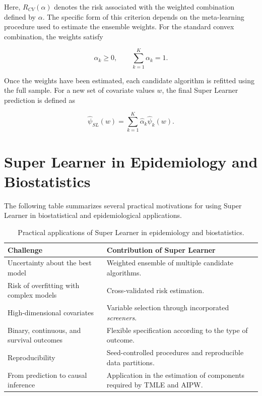 \documentclass[12pt]{article}
\begin{document}
Here, $R_{CV}(\alpha)$ denotes the risk associated with the weighted combination defined by $\alpha$.
The specific form of this criterion depends on the meta-learning procedure used to estimate the ensemble weights. For the standard convex combination, the weights satisfy

\begin{equation}
    \alpha_k \geq 0,
    \qquad
    \sum_{k=1}^{K} \alpha_k = 1.
\end{equation}

Once the weights have been estimated, each candidate algorithm is refitted using the full sample. For a new set of covariate values $w$, the final Super Learner prediction is defined as

\begin{equation}
    \widehat{\psi}_{SL}(w)
    =
    \sum_{k=1}^{K}
    \widehat{\alpha}_k
    \widehat{\psi}_k(w).
\end{equation}

\section{Super Learner in Epidemiology and Biostatistics}
The following table summarizes several practical motivations for using Super Learner in biostatistical and epidemiological applications.

\begin{table}[H]
\centering
\caption{Practical applications of Super Learner in epidemiology and biostatistics.}
\label{tab:sl_applications}
\begin{tabularx}{\textwidth}{p{} X}
\toprule
\textbf{Challenge} & \textbf{Contribution of Super Learner} \\
\midrule
Uncertainty about the best model & Weighted ensemble of multiple candidate algorithms. \\
Risk of overfitting with complex models & Cross-validated risk estimation. \\
High-dimensional covariates & Variable selection through incorporated \textit{screeners}. \\
Binary, continuous, and survival outcomes & Flexible specification according to the type of outcome. \\
Reproducibility & Seed-controlled procedures and reproducible data partitions. \\
From prediction to causal inference & Application in the estimation of components required by TMLE and AIPW. \\
\bottomrule
\end{tabularx}
\end{table}
\end{document}
